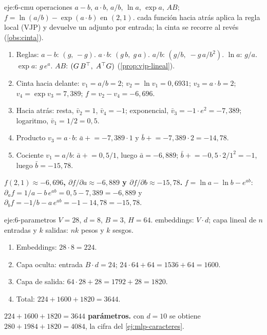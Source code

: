 \begin{solucion}{eje:6-cmu}
\datos operaciones $a-b$, $a\cdot b$, $a/b$, $\ln a$, $\exp a$, $AB$; $f=\ln(a/b)-\exp(a\cdot b)$ en $(2,1)$.
\planteamiento cada función hacia atrás aplica la regla local (VJP) y devuelve un adjunto por entrada; la cinta se recorre al revés (\cref{obs:cinta}).
\pasos
\begin{enumerate}[label=\arabic*.]
  \item Reglas: $a-b$: $(g,\,-g)$. $a\cdot b$: $(g\,b,\;g\,a)$. $a/b$: $(g/b,\;-g\,a/b^{2})$. $\ln a$: $g/a$. $\exp a$: $g\,e^{a}$. $AB$: $(G\,B^{\top},\;A^{\top} G)$ (\cref{prop:vjp-lineal}).
  \item Cinta hacia delante: $v_1=a/b=2$; $v_2=\ln v_1=0{,}6931$; $v_3=a\cdot b=2$; $v_4=\exp v_3=7{,}389$; $f=v_2-v_4=-6{,}696$.
  \item Hacia atrás: resta, $\bar v_2=1$, $\bar v_4=-1$; exponencial, $\bar v_3=-1\cdot e^{2}=-7{,}389$; logaritmo, $\bar v_1=1/2=0{,}5$.
  \item Producto $v_3=a\cdot b$: $\bar a\mathrel{+}=-7{,}389\cdot 1$ y $\bar b\mathrel{+}=-7{,}389\cdot 2=-14{,}78$.
  \item Cociente $v_1=a/b$: $\bar a\mathrel{+}=0{,}5/1$, luego $\bar a=-6{,}889$; $\bar b\mathrel{+}=-0{,}5\cdot 2/1^{2}=-1$, luego $\bar b=-15{,}78$.
\end{enumerate}
\resultado \textbf{$f(2,1)\approx-6{,}696$, $\partial f/\partial a\approx-6{,}889$ y $\partial f/\partial b\approx-15{,}78$.}
\comprobacion $f=\ln a-\ln b-e^{ab}$: $\partial_af=1/a-b\,e^{ab}=0{,}5-7{,}389=-6{,}889$ y $\partial_bf=-1/b-a\,e^{ab}=-1-14{,}78=-15{,}78$.
\end{solucion}

\begin{solucion}{eje:6-parametros}
\datos $V=28$, $d=8$, $B=3$, $H=64$.
\planteamiento embeddings: $V\cdot d$; capa lineal de $n$ entradas y $k$ salidas: $nk$ pesos y $k$ sesgos.
\pasos
\begin{enumerate}[label=\arabic*.]
  \item Embeddings: $28\cdot 8=224$.
  \item Capa oculta: entrada $B\cdot d=24$; $24\cdot 64+64=1536+64=1600$.
  \item Capa de salida: $64\cdot 28+28=1792+28=1820$.
  \item Total: $224+1600+1820=3644$.
\end{enumerate}
\resultado \textbf{$224+1600+1820=3644$ parámetros.}
\comprobacion con $d=10$ se obtiene $280+1984+1820=4084$, la cifra del \cref{ej:mlp-caracteres}.
\end{solucion}

